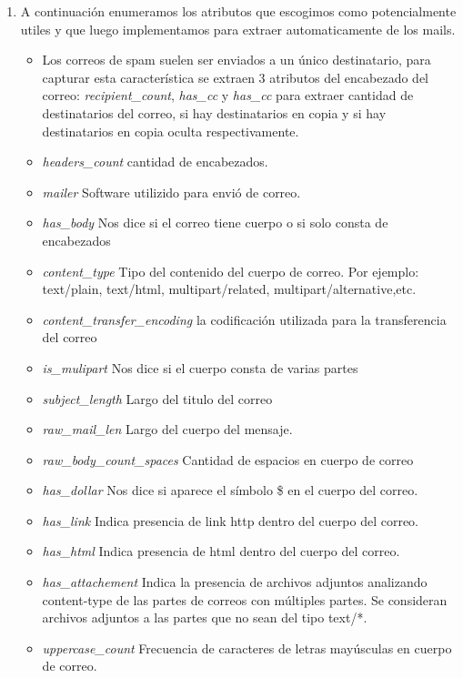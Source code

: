 

\begin{enumerate}

\item A continuación enumeramos los atributos que escogimos como potencialmente utiles y que luego implementamos para extraer automaticamente de los mails.

\begin{itemize}
\item Los correos de spam suelen ser enviados a un único destinatario, para capturar esta característica se extraen 3 atributos del encabezado del correo: \textit{recipient\_count}, \textit{has\_cc} y \textit{has\_cc} para extraer cantidad de destinatarios del correo, si hay destinatarios en copia y si hay destinatarios en copia oculta respectivamente.
\item \textit{headers\_count} cantidad de encabezados.
\item \textit{mailer} Software utilizido para envió de correo. 
\item \textit{has\_body} Nos dice si el correo tiene cuerpo o si solo consta de encabezados
\item \textit{content\_type} Tipo del contenido del cuerpo de correo. Por ejemplo: text/plain, text/html, multipart/related, multipart/alternative,etc. 
\item \textit{content\_transfer\_encoding} la codificación utilizada para la transferencia del correo
\item \textit{is\_mulipart} Nos dice si el cuerpo consta de varias partes
\item \textit{subject\_length} Largo del titulo  del correo
\item \textit{raw\_mail\_len} Largo del cuerpo del mensaje. 
\item \textit{raw\_body\_count\_spaces} Cantidad de espacios en cuerpo de correo
\item \textit{has\_dollar} Nos dice si aparece el símbolo \$ en el cuerpo del correo. 
\item \textit{has\_link} Indica presencia de link http dentro del cuerpo del correo. 
\item \textit{has\_html} Indica presencia de html dentro del cuerpo del correo. 
\item \textit{has\_attachement} Indica la presencia de archivos adjuntos analizando content-type de las partes de correos con múltiples partes. Se consideran archivos adjuntos  a las partes que no sean del tipo text/*. 
\item \textit{uppercase\_count} Frecuencia de caracteres de letras mayúsculas en cuerpo de correo.  

\end{itemize}
\end{enumerate}
